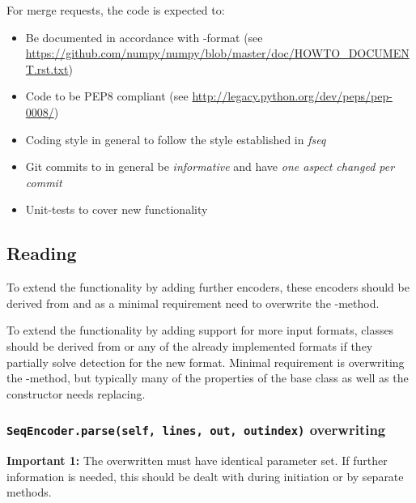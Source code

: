 \documentclass[letterpaper,10pt,english]{sphinxmanual}
\begin{document}
For merge requests, the code is expected to:
\begin{itemize}
\item {} 
Be documented in accordance with -format
(see \href{https://github.com/numpy/numpy/blob/master/doc/HOWTO\_DOCUMENT.rst.txt}{https://github.com/numpy/numpy/blob/master/doc/HOWTO\_DOCUMENT.rst.txt})

\item {} 
Code to be PEP8 compliant
(see \href{http://legacy.python.org/dev/peps/pep-0008/}{http://legacy.python.org/dev/peps/pep-0008/})

\item {} 
Coding style in general to follow the style established in \emph{fseq}

\item {} 
Git commits to in general be \emph{informative} and have
\emph{one aspect changed per commit}

\item {} 
Unit-tests to cover new functionality

\end{itemize}


\subsection{Reading}
\label{developers:reading}
To extend the functionality by adding further encoders, these encoders should
be derived from {\hyperref[fseq.reading:fseq.reading.seq_encoder.SeqEncoder]{}} and as a minimal
requirement need to overwrite the
{\hyperref[fseq.reading:fseq.reading.seq_encoder.SeqEncoder.parse]{}}-method.

To extend the functionality by adding support for more input formats, classes
should be derived from
{\hyperref[fseq.reading:fseq.reading.seq_encoder.SeqFormat]{}} or any of the already implemented
formats if they partially solve detection for the new format.
Minimal requirement is overwriting the
{\hyperref[fseq.reading:fseq.reading.seq_encoder.SeqFormat.expects]{}}-method, but
typically many of the properties of the base class as well as the
constructor needs replacing.


\subsubsection{\texttt{SeqEncoder.parse(self, lines, out, outindex)} overwriting}
\label{developers:seqencoder-parse-self-lines-out-outindex-overwriting}
\textbf{Important 1:} The overwritten
{\hyperref[fseq.reading:fseq.reading.seq_encoder.SeqEncoder.parse]{}} must have identical
parameter set. If further information is needed, this should be dealt with
during initiation or by separate methods.
\end{document}
